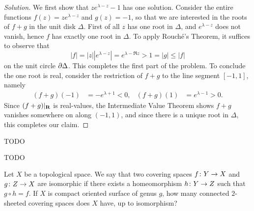 \begin{proof}[Solution]
  We first show that $z e^{\lambda-z} - 1$ has one solution. Consider the entire functions $f(z) = z e^{\lambda-z}$ and $g(z) = -1$, so that we are interested in the roots of $f+g$ in the unit disk $\Delta$. First of all $z$ has one root in $\Delta$, and $e^{\lambda-z}$ does not vanish, hence $f$ has exactly one root in $\Delta$. To apply Rouch\'e's Theorem, it suffices to observe that
  \[
  |f| =
  |z| |e^{\lambda-z}| =
  e^{\lambda-\Re z} >
  1 =
  |g| \leq
  |f|
  \]
  on the unit circle $\partial\Delta$. This completes the first part of the problem. To conclude the one root is real, consider the restriction of $f+g$ to the line segment $[-1,1]$, namely
  \begin{align*}
    (f+g)(-1) &= -e^{\lambda+1} < 0, &
    (f+g)(1) &= e^{\lambda-1} > 0.
  \end{align*}
  Since $(f+g)|_{\mathbf{R}}$ is real-values, the Intermediate Value Theorem shows $f+g$ vanishes somewhere on along $(-1,1)$, and since there is a unique root in $\Delta$, this completes our claim.
\end{proof}


TODO


TODO


Let $X$ be a topological space. We say that two covering spaces $f \colon Y \rightarrow X$ and $g \colon Z \rightarrow X$ are isomorphic if there exists a homeomorphism $h \colon Y \rightarrow Z$ such that $g \circ h = f$. If $X$ is compact oriented surface of genus $g$, how many connected $2$-sheeted covering spaces does $X$ have, up to isomorphism?

